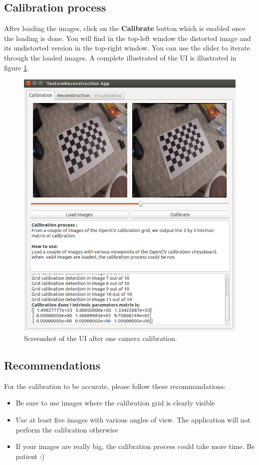 \documentclass[12pt]{article}
\begin{document}
\subsection{Calibration process}
After loading the images, click on the \textbf{Calibrate} button which is enabled once the loading is done. You will find in the top-left window the distorted image and its undistorted version in the top-right window. You can use the slider to iterate through the loaded images.
A complete illustrated of the UI is illustrated in figure \ref{fig:calibration}.

\begin{figure}[!ht]
    \centering
	\includegraphics[width=\linewidth]{img/calibrated}
\caption{Screenshot of the UI after one camera calibration.}
\label{fig:calibration}
\end{figure}

\subsection{Recommendations}
For the calibration to be accurate, please follow these recommandations:
\begin{itemize}
    \item Be sure to use images where the calibration grid is clearly visible
    \item Use at least five images with various angles of view. The application will not perform the calibration otherwise
    \item If your images are really big, the calibration process could take more time. Be patient :) 
\end{itemize}
\end{document}
